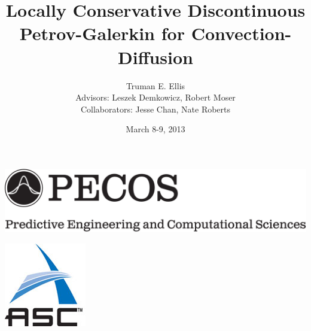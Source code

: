 \documentclass[mathserif]{beamer}
\date{March 8-9, 2013}
\author[T. E. Ellis]{Truman E. Ellis\\\medskip
\small{Advisors: Leszek Demkowicz, Robert Moser\\
Collaborators: Jesse Chan, Nate Roberts}}
\institute{The University of Texas at Austin}
\title[Locally Conservative DPG]{Locally Conservative Discontinuous 
Petrov-Galerkin for Convection-Diffusion}
\begin{document}
\begin{frame}
\begin{center}
\includegraphics[width=.8\linewidth]{grand_logo}\\
\end{center}
\titlepage
\begin{flushright}
\includegraphics[scale=0.1]{asc_logo}\\
\end{flushright}
\end{frame}

\end{document}
